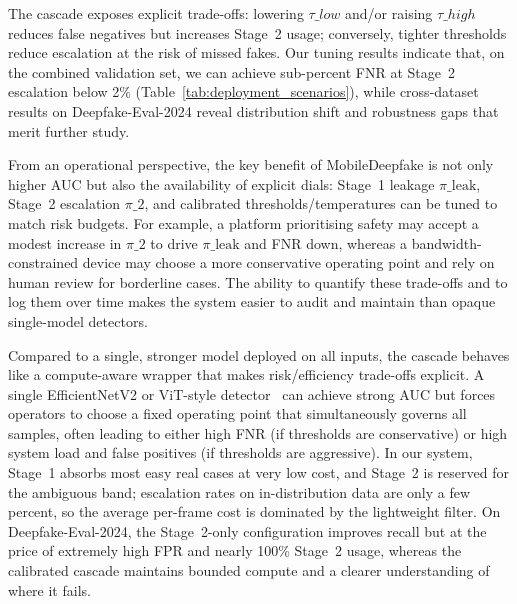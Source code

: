 The cascade exposes explicit trade\hyp offs: lowering $\tau\_{low}$ and/or raising $\tau\_{high}$ reduces false negatives but increases Stage~2 usage; conversely, tighter thresholds reduce escalation at the risk of missed fakes. Our tuning results indicate that, on the combined validation set, we can achieve sub\hyp percent FNR at Stage~2 escalation below 2\% (Table~\ref{tab:deployment_scenarios}), while cross\hyp dataset results on Deepfake\hyp Eval\hyp 2024 reveal distribution shift and robustness gaps that merit further study.

From an operational perspective, the key benefit of MobileDeepfake is not only higher AUC but also the availability of explicit dials: Stage~1 leakage $\pi\_{\mathrm{leak}}$, Stage~2 escalation $\pi\_2$, and calibrated thresholds/temperatures can be tuned to match risk budgets. For example, a platform prioritising safety may accept a modest increase in $\pi\_2$ to drive $\pi\_{\mathrm{leak}}$ and FNR down, whereas a bandwidth\hyp constrained device may choose a more conservative operating point and rely on human review for borderline cases. The ability to quantify these trade\hyp offs and to log them over time makes the system easier to audit and maintain than opaque single\hyp model detectors.

Compared to a single, stronger model deployed on all inputs, the cascade behaves like a compute\hyp aware wrapper that makes risk/efficiency trade\hyp offs explicit. A single EfficientNetV2 or ViT\hyp style detector~\cite{dosovitskiy2021vit,liu2021swin,pei2024deepfakesurvey} can achieve strong AUC but forces operators to choose a fixed operating point that simultaneously governs all samples, often leading to either high FNR (if thresholds are conservative) or high system load and false positives (if thresholds are aggressive). In our system, Stage~1 absorbs most easy real cases at very low cost, and Stage~2 is reserved for the ambiguous band; escalation rates on in\hyp distribution data are only a few percent, so the average per\hyp frame cost is dominated by the lightweight filter. On Deepfake\hyp Eval\hyp 2024, the Stage~2\hyp only configuration improves recall but at the price of extremely high FPR and nearly 100\% Stage~2 usage, whereas the calibrated cascade maintains bounded compute and a clearer understanding of where it fails.

